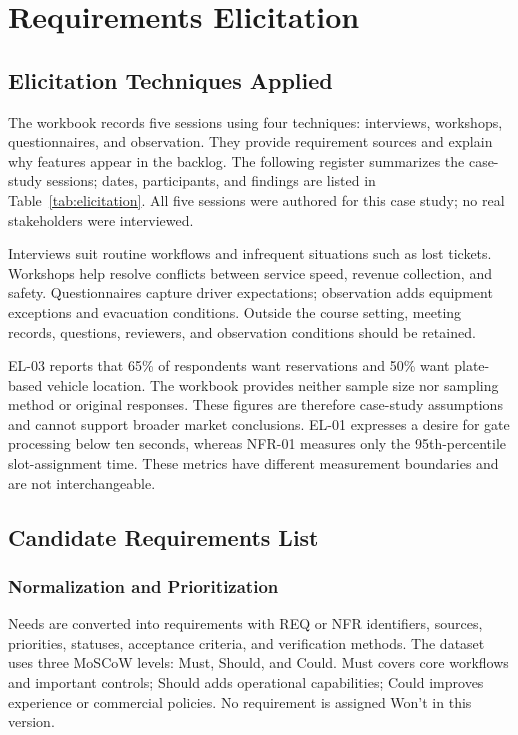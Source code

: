\chapter{Requirements Elicitation}
\section{Elicitation Techniques Applied}
The workbook records five sessions using four techniques: interviews, workshops, questionnaires, and observation. They provide requirement sources and explain why features appear in the backlog. The following register summarizes the case-study sessions; dates, participants, and findings are listed in Table~\ref{tab:elicitation}. All five sessions were authored for this case study; no real stakeholders were interviewed.


Interviews suit routine workflows and infrequent situations such as lost tickets. Workshops help resolve conflicts between service speed, revenue collection, and safety. Questionnaires capture driver expectations; observation adds equipment exceptions and evacuation conditions. Outside the course setting, meeting records, questions, reviewers, and observation conditions should be retained.

EL-03 reports that 65\% of respondents want reservations and 50\% want plate-based vehicle location. The workbook provides neither sample size nor sampling method or original responses. These figures are therefore case-study assumptions and cannot support broader market conclusions. EL-01 expresses a desire for gate processing below ten seconds, whereas NFR-01 measures only the 95th-percentile slot-assignment time. These metrics have different measurement boundaries and are not interchangeable.

\section{Candidate Requirements List}
\subsection{Normalization and Prioritization}
Needs are converted into requirements with REQ or NFR identifiers, sources, priorities, statuses, acceptance criteria, and verification methods. The dataset uses three MoSCoW levels: Must, Should, and Could. Must covers core workflows and important controls; Should adds operational capabilities; Could improves experience or commercial policies. No requirement is assigned Won't in this version.


